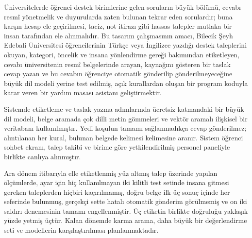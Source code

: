 \begin{center}
{\bfseries\BaslikTR\par}
\end{center}
\vspace{0.4cm}

Üniversitelerde öğrenci destek birimlerine gelen soruların büyük bölümü, cevabı resmî yönetmelik
ve duyurularda zaten bulunan tekrar eden sorulardır; buna karşın hesap ele geçirilmesi, taciz,
not itirazı gibi hassas talepler mutlaka bir insan tarafından ele alınmalıdır. Bu tasarım
çalışmasının amacı, Bilecik Şeyh Edebali Üniversitesi öğrencilerinin Türkçe veya İngilizce yazdığı
destek taleplerini okuyan, kategori, öncelik ve insana yönlendirme gereği bakımından etiketleyen,
cevabı üniversitenin resmî belgelerinde arayan, kaynağını gösteren bir taslak cevap yazan ve bu
cevabın öğrenciye otomatik gönderilip gönderilmeyeceğine büyük dil modeli yerine test edilmiş, açık
kurallardan oluşan bir program koduyla karar veren bir yardım masası asistanı geliştirmektir.

Sistemde etiketleme ve taslak yazma adımlarında ücretsiz katmandaki bir büyük dil modeli, belge
aramada çok dilli metin gömmeleri ve vektör aramalı ilişkisel bir veritabanı kullanılmıştır. Yedi
koşulun tamamı sağlanmadıkça cevap gönderilmez; alıntılanan her kural, bulunan belgede kelimesi
kelimesine aranır. Sistem öğrenci sohbet ekranı, talep takibi ve birime göre yetkilendirilmiş
personel paneliyle birlikte canlıya alınmıştır.

Ara dönem itibarıyla elle etiketlenmiş yüz altmış talep üzerinde yapılan ölçümlerde, ayar için hiç
kullanılmayan iki kilitli test setinde insana gitmesi gereken taleplerden hiçbiri kaçırılmamış, doğru
belge ilk üç sonuç içinde her seferinde bulunmuş, gerçekçi sette hatalı otomatik gönderim
görülmemiş ve on iki saldırı denemesinin tamamı engellenmiştir. Üç etiketin birlikte doğruluğu
yaklaşık yüzde yetmiş üçtür. Kalan dönemde karma arama, daha büyük bir değerlendirme seti ve
modellerin karşılaştırılması planlanmaktadır.

\vspace{1cm}

\begin{center}
{\bfseries\BaslikEN\par}
\end{center}
\vspace{0.4cm}


